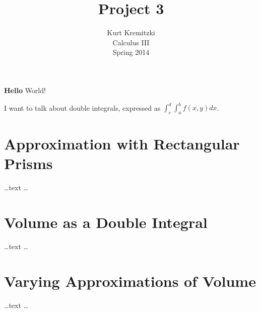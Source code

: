 \documentclass{article}
\begin{document}
\title{Project 3}
\author{Kurt Kremitzki\\
        Calculus III\\
        Spring 2014}
\maketitle

{\bf Hello} World!

I want to talk about double integrals, expressed as $\int_c^d\int_a^b f(x,y) dx$.

\section{Approximation with Rectangular Prisms}
    \ldots text \ldots

\section{Volume as a Double Integral}
    \ldots text \ldots

\section{Varying Approximations of Volume}
    \ldots text \ldots
\end{document}
